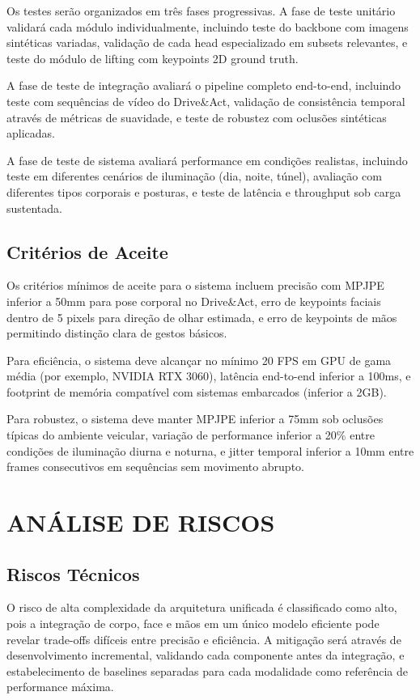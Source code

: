 \documentclass[12pt, a4paper]{article}
\begin{document}
Os testes serão organizados em três fases progressivas. A fase de teste unitário validará cada módulo individualmente, incluindo teste do backbone com imagens sintéticas variadas, validação de cada head especializado em subsets relevantes, e teste do módulo de lifting com keypoints 2D ground truth.

A fase de teste de integração avaliará o pipeline completo end-to-end, incluindo teste com sequências de vídeo do Drive\&Act, validação de consistência temporal através de métricas de suavidade, e teste de robustez com oclusões sintéticas aplicadas.

A fase de teste de sistema avaliará performance em condições realistas, incluindo teste em diferentes cenários de iluminação (dia, noite, túnel), avaliação com diferentes tipos corporais e posturas, e teste de latência e throughput sob carga sustentada.

\subsection{Critérios de Aceite}

Os critérios mínimos de aceite para o sistema incluem precisão com MPJPE inferior a 50mm para pose corporal no Drive\&Act, erro de keypoints faciais dentro de 5 pixels para direção de olhar estimada, e erro de keypoints de mãos permitindo distinção clara de gestos básicos.

Para eficiência, o sistema deve alcançar no mínimo 20 FPS em GPU de gama média (por exemplo, NVIDIA RTX 3060), latência end-to-end inferior a 100ms, e footprint de memória compatível com sistemas embarcados (inferior a 2GB).

Para robustez, o sistema deve manter MPJPE inferior a 75mm sob oclusões típicas do ambiente veicular, variação de performance inferior a 20\% entre condições de iluminação diurna e noturna, e jitter temporal inferior a 10mm entre frames consecutivos em sequências sem movimento abrupto.

\section{ANÁLISE DE RISCOS}

\subsection{Riscos Técnicos}

O risco de alta complexidade da arquitetura unificada é classificado como alto, pois a integração de corpo, face e mãos em um único modelo eficiente pode revelar trade-offs difíceis entre precisão e eficiência. A mitigação será através de desenvolvimento incremental, validando cada componente antes da integração, e estabelecimento de baselines separadas para cada modalidade como referência de performance máxima.
\end{document}
